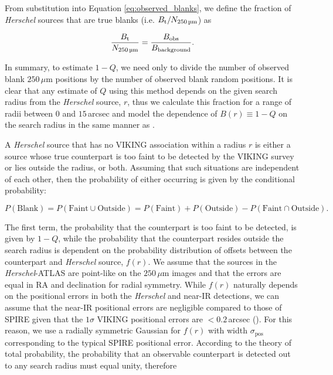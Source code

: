 From substitution into Equation \ref{eq:observed_blanks}, we define the fraction of \textit{Herschel} sources that are true blanks (i.e. $B_{\textrm{t}}/N_{\textrm{250\,\micron}}$) as

\begin{equation}
    \frac{B_{\textrm{t}}}{N_{\textrm{250\,\micron}}} = \frac{B_{\textrm{obs}}}{B_{\textrm{background}}}.
    \label{eq:true_blanks}
\end{equation}

In summary, to estimate $1-Q$, we need only to divide the number of observed blank $250\,\mu$m positions by the number of observed blank random positions. It is clear that any estimate of $Q$ using this method depends on the given search radius from the \textit{Herschel} source, $r$, thus we calculate this fraction for a range of radii between $0$ and $15\,$arcsec and model the dependence of $B(r) \equiv 1 - Q$ on the search radius in the same manner as \citealt{Fleuren_2012}.

A \textit{Herschel} source that has no VIKING association within a radius $r$ is either a source whose true counterpart is too faint to be detected by the VIKING survey or lies outside the radius, or both. Assuming that such situations are independent of each other, then the probability of either occurring is given by the conditional probability:

\begin{equation}
\label{eq:blank_probability}
    P(\textrm{Blank}) = P(\textrm{Faint} \cup \textrm{Outside}) = P(\textrm{Faint}) + P(\textrm{Outside}) - P(\textrm{Faint} \cap \textrm{Outside}).
\end{equation}

The first term, the probability that the counterpart is too faint to be detected, is given by $1-Q$, while the probability that the counterpart resides outside the search radius is dependent on the probability distribution of offsets between the counterpart and \textit{Herschel} source, $f(r)$. We assume that the sources in the \textit{Herschel}-ATLAS are point-like on the $250\,\mu$m images and that the errors are equal in RA and declination for radial symmetry. While $f(r)$ naturally depends on the positional errors in both the \textit{Herschel} and near-IR detections, we can assume that the near-IR positional errors are negligible compared to those of SPIRE given that the $1\sigma$ VIKING positional errors are $< 0.2\,$arcsec (\citealt{Fleuren_2012}). For this reason, we use a radially symmetric Gaussian for $f(r)$ with width $\sigma_\textrm{pos}$ corresponding to the typical SPIRE positional error. According to the theory of total probability, the probability that an observable counterpart is detected out to any search radius must equal unity, therefore 

